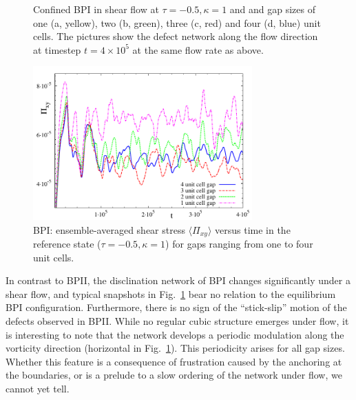 \documentclass[12pt,twoside]{iopart}
\newcommand{\ex}[1]{\times10^{#1}}
\begin{document}
\begin{figure}[h]
\caption{Confined BPI in shear flow at $\tau=-0.5, \kappa=1$ and and gap sizes of one (a, yellow), two (b, green), three (c, red) and four (d, blue) unit cells. The pictures show the defect network along the flow direction at timestep $t=4\ex{5}$ at the same flow rate as above.}
\label{fig4}
\end{figure}


\begin{figure}[h]
\centering
\includegraphics[width=0.75\textwidth]{stress_bp1_fbc.pdf}
\caption{BPI: ensemble-averaged shear stress $\langle \Pi_{xy}\rangle$
versus time in the reference state ($\tau=-0.5, \kappa=1$) for gaps
ranging from one to four unit cells.}
\label{fig5}
\end{figure}

In contrast to BPII, the disclination network of BPI changes significantly
under a shear flow, and typical snapshots in Fig.~\ref{fig4} bear no
relation to the equilibrium BPI configuration. Furthermore, there is no sign of the ``stick-slip'' motion of the defects observed in BPII. While no regular cubic structure emerges under flow, it is interesting to note that the network develops a periodic modulation along the vorticity direction (horizontal in Fig.~\ref{fig4}). This periodicity arises for all gap sizes. Whether this feature is a consequence of frustration caused by the anchoring at the boundaries, or is a prelude to a slow ordering of the network under flow, we cannot yet tell.
\end{document}
